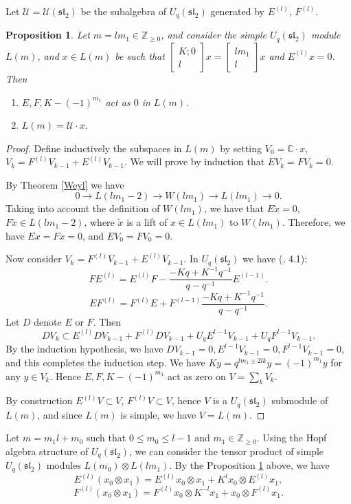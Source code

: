 \documentclass[11pt]{amsart}
\newcommand\lie[1]{\mathfrak{#1}}
\newcommand\qbin[2]{\left[  \begin{array}{c}  #1 \\ #2  \end{array}  \right]}
\newcommand{\CC}{\mathbb{C}}
\newtheorem{proposition}[theorem]{Proposition}
\begin{document}
Let $\mathcal{U} = \mathcal{U}(\lie{sl}_2)$ be the subalgebra of $U_q(\lie{sl}_2)$ generated by $E^{(l)}$, $F^{(l)}$.
\begin{proposition}  \label{L(lm)} 
 Let $m = lm_1 \in \mathbb{Z}_{\geq 0}$, and consider the simple $U_q(\lie{sl}_2)$ module $L(m)$, and $x \in L(m)$ 
 be such that $\qbin{K ; 0}{l} x = \qbin{l m_1}{l} x$ and $E^{(l)}x =0$.  Then 
 \begin{enumerate} 
 \item $E, F, K - (-1)^{m_1}$ act as $0$ in $L(m)$. 
 \item $L(m) = \mathcal{U} \cdot x$. 
 \end{enumerate} 
\end{proposition} 
\begin{proof} 
Define inductively the subspaces in $L(m)$ by setting  $V_0 = \CC \cdot x$, $V_k = F^{(l)} V_{k-1} + E^{(l)} V_{k-1}$. 
We will prove by induction that $EV_k = FV_k=0$. 
 
By Theorem \ref{Weyl} we have 
\[ 0 \longrightarrow L(lm_1 -2) \longrightarrow W(l m_1)  \longrightarrow L(lm_1) \longrightarrow 0 . \]
Taking into account the definition of $W(l m_1)$, we have that $E \tilde{x} =0$,  $F \tilde{x} \in L(lm_1 -2)$, where $\tilde{x}$ is a lift of $x \in L(lm_1)$ to $W(lm_1)$. Therefore, we have $Ex = Fx =0$, and $E V_0 = F V_0 = 0$.  

Now consider $V_k = F^{(l)} V_{k-1} + E^{(l)} V_{k-1}$. 
In $U_q(\lie{sl}_2)$ we have (\cite{Lus89}, 4.1): 
\[  F E^{(l)}  = E^{(l)} F - \frac{-Kq + K^{-1} q^{-1}}{q-q^{-1}} E^{(l-1)} .\] 
\[  E F^{(l)}  = F^{(l)}E + F^{(l-1)} \frac{-Kq + K^{-1} q^{-1}}{q-q^{-1}} .\] 
Let $D$ denote $E$ or $F$. Then 
\[ D V_k \subset E^{(l)} D V_{k-1} + F^{(l)} D V_{k-1} + U_q E^{l-1} V_{k-1} + U_q F^{l-1} V_{k-1} .\] 
By the induction hypothesis, we have $DV_{k-1} =0, E^{l-1}V_{k-1} = 0, F^{l-1} V_{k-1} =0$, and this completes the induction step. We have $K y = q^{lm_1 \pm 2lk} y = (-1)^{m_1} y$ for any $y \in V_k$. Hence $E, F, K- (-1)^{m_1}$ act as zero on 
$V =\sum_{k} V_k$.  

By construction $E^{(l)} V \subset V$, $F^{(l)} V \subset V$, hence $V$ is a $U_q(\lie{sl}_2)$ submodule of $L(m)$, and since $L(m)$ is simple, we have $V = L(m)$.
\end{proof} 

Let $m = m_1 l + m_0$ such that $0 \leq m_0 \leq l-1$ and $m_1  \in \mathbb{Z}_{\geq 0}$.  Using the Hopf algebra structure of $U_q(\lie{sl}_2)$, we can consider the tensor product 
of simple $U_q(\lie{sl}_2)$ modules $L(m_0) \otimes L(lm_1)$.  By the Proposition \ref{L(lm)} above, we have 
\[ E^{(l)} (x_0 \otimes x_1) = E^{(l)} x_0 \otimes x_1  + K^l x_0 \otimes E^{(l)} x_1 , \] 
\[ F^{(l)} (x_0 \otimes x_1) = F^{(l)} x_0 \otimes K^{-l} x_1  + x_0 \otimes F^{(l)} x_1 . \] 
\end{document}
